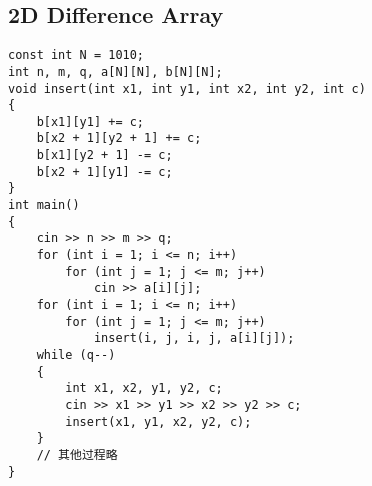 \subsection{2D Difference Array}
\begin{lstlisting}
const int N = 1010;
int n, m, q, a[N][N], b[N][N];
void insert(int x1, int y1, int x2, int y2, int c)
{
    b[x1][y1] += c;
    b[x2 + 1][y2 + 1] += c;
    b[x1][y2 + 1] -= c;
    b[x2 + 1][y1] -= c;
}
int main()
{
    cin >> n >> m >> q;
    for (int i = 1; i <= n; i++)
        for (int j = 1; j <= m; j++)
            cin >> a[i][j];
    for (int i = 1; i <= n; i++)
        for (int j = 1; j <= m; j++)
            insert(i, j, i, j, a[i][j]);
    while (q--)
    {
        int x1, x2, y1, y2, c;
        cin >> x1 >> y1 >> x2 >> y2 >> c;
        insert(x1, y1, x2, y2, c);
    }
    // 其他过程略
}
\end{lstlisting}